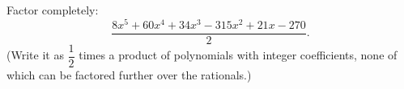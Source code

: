 Factor completely:
\[\dfrac{8x^5+60x^4+34x^3-315x^2+21x-270}{2}.\]
(Write it as $\dfrac12$ times a product of polynomials with integer coefficients, none of which can be factored further over the rationals.)
